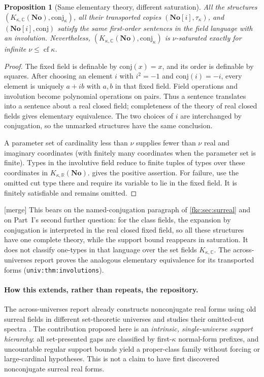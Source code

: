 \documentclass[11pt,letterpaper]{article}
\numberwithin{equation}{section}
\newtheorem{proposition}[theorem]{Proposition}
\theoremstyle{definition}
\theoremstyle{remark}
\newcommand{\R}{\mathbb R}
\newcommand{\C}{\mathbb C}
\newcommand{\No}{\mathbf{No}}
\newcommand{\cf}{\operatorname{cf}}
\newcommand{\KC}{K_{\kappa,\C}}
\newcommand{\mergetag}{\textup{\textsf{\small[merge]}}}%
\newcommand{\SC}{\mathbf{No}[i]}
\newcommand{\conj}{\mathrm{conj}}
\newcommand{\KN}[2]{K_{#1,#2}(\No)}%
\newcommand{\lbl}[1]{\nolinkurl{#1}}%
\begin{document}
\begin{proposition}[Same elementary theory, different saturation]\label{fkc:sb:prop:sametheory}
All the structures $(\KN\kappa\C,\conj_\kappa)$, all their transported copies $(\SC,\tau_\kappa)$, and $(\SC,\conj)$ satisfy the same first-order sentences in the field language with an involution. Nevertheless, $(\KN\kappa\C,\conj_\kappa)$ is $\nu$-saturated exactly for infinite $\nu\le\cf\kappa$.
\end{proposition}
\begin{proof}
The fixed field is definable by $\conj(x)=x$, and its order is definable by squares. After choosing an element $i$ with $i^2=-1$ and $\conj(i)=-i$, every element is uniquely $a+ib$ with $a,b$ in that fixed field. Field operations and involution become polynomial operations on pairs. Thus a sentence translates into a sentence about a real closed field; completeness of the theory of real closed fields gives elementary equivalence. The two choices of $i$ are interchanged by conjugation, so the unmarked structures have the same conclusion.

A parameter set of cardinality less than $\nu$ supplies fewer than $\nu$ real and imaginary coordinates (with finitely many coordinates when the parameter set is finite). Types in the involutive field reduce to finite tuples of types over these coordinates in $\KN\kappa\R$.  gives the positive assertion. For failure, use the omitted cut type there and require its variable to lie in the fixed field. It is finitely satisfiable and remains omitted.
\end{proof}
\mergetag{} This bears on the named-conjugation paragraph of \cref{fkc:sec:surreal} and on Part~I's second further question: for the class fields, the expansion by conjugation is interpreted in the real closed fixed field, so all these structures have one complete theory, while the support bound reappears in saturation. It does not classify one-types in that language over the set fields $\KC$. The across-universes report proves the analogous elementary equivalence for its transported forms (\lbl{univ:thm:involutions}).

\paragraph{How this extends, rather than repeats, the repository.}
The across-universes report already constructs nonconjugate real forms using old surreal fields in different set-theoretic universes and studies their omitted-cut spectra \cite{CollUniv}. The contribution proposed here is an \emph{intrinsic, single-universe support hierarchy}: all set-presented gaps are classified by first-$\kappa$ normal-form prefixes, and uncountable regular support bounds yield a proper-class family without forcing or large-cardinal hypotheses. This is not a claim to have first discovered nonconjugate surreal real forms.
\end{document}

